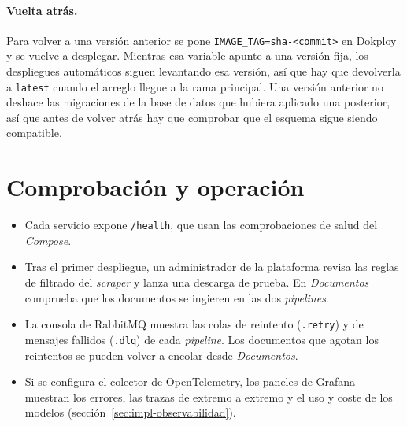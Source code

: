 \paragraph{Vuelta atrás.} Para volver a una versión anterior se pone \texttt{IMAGE\_TAG=sha-<commit>} en Dokploy y se vuelve a desplegar. Mientras esa variable apunte a una versión fija, los despliegues automáticos siguen levantando esa versión, así que hay que devolverla a \texttt{latest} cuando el arreglo llegue a la rama principal. Una versión anterior no deshace las migraciones de la base de datos que hubiera aplicado una posterior, así que antes de volver atrás hay que comprobar que el esquema sigue siendo compatible.

\section{Comprobación y operación}

\begin{itemize}
  \item Cada servicio expone \texttt{/health}, que usan las comprobaciones de salud del \emph{Compose}.
  \item Tras el primer despliegue, un administrador de la plataforma revisa las reglas de filtrado del \emph{scraper} y lanza una descarga de prueba. En \emph{Documentos} comprueba que los documentos se ingieren en las dos \emph{pipelines}.
  \item La consola de RabbitMQ muestra las colas de reintento (\texttt{.retry}) y de mensajes fallidos (\texttt{.dlq}) de cada \emph{pipeline}. Los documentos que agotan los reintentos se pueden volver a encolar desde \emph{Documentos}.
  \item Si se configura el colector de OpenTelemetry, los paneles de Grafana muestran los errores, las trazas de extremo a extremo y el uso y coste de los modelos (sección~\ref{sec:impl-observabilidad}).
\end{itemize}
